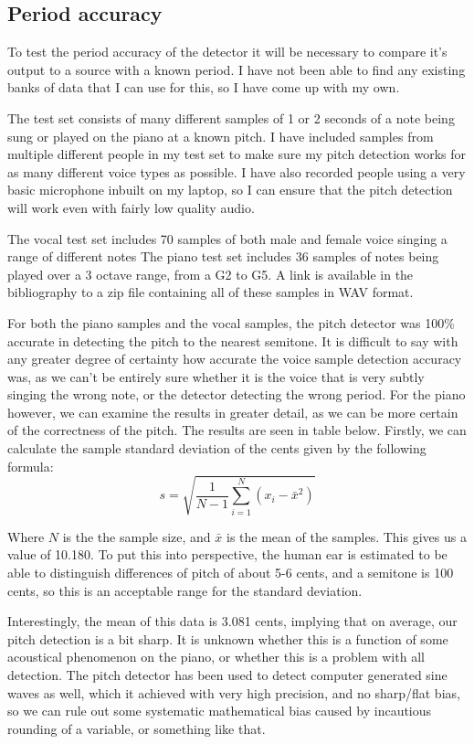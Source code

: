 \subsection{Period accuracy}
To test the period accuracy of the detector it will be necessary to compare it's output to a source with a known period. I have not been able to find any existing banks of data that I can use for this, so I have come up with my own\cite{testAudio}.

The test set consists of many different samples of 1 or 2 seconds of a note being sung or played on the piano at a known pitch. I have included samples from multiple different people in my test set to make sure my pitch detection works for as many different voice types as possible. I have also recorded people using a very basic microphone inbuilt on my laptop, so I can ensure that the pitch detection will work even with fairly low quality audio. 

The vocal test set includes 70 samples of both male and female voice singing a range of different notes The piano test set includes 36 samples of notes being played over a 3 octave range, from a G2 to G5. A link is available in the bibliography to a zip file containing all of these samples in WAV format\cite{testAudio}.

For both the piano samples and the vocal samples, the pitch detector was 100\% accurate in detecting the pitch to the nearest semitone. It is difficult to say with any greater degree of certainty how accurate the voice sample detection accuracy was, as we can't be entirely sure whether it is the voice that is very subtly singing the wrong note, or the detector detecting the wrong period. For the piano however, we can examine the results in  greater detail, as we can be more certain of the correctness of the pitch. The results are seen in table below.
Firstly, we can calculate the sample standard deviation of the cents given by the following formula:
\[s=\sqrt{\frac{1}{N-1}\sum_{i=1}^{N} (x_i - \bar{x}^2)}\]

Where \(N\) is the the sample size, and \(\bar{x}\) is the mean of the samples. This gives us a value of 10.180. To put this into perspective, the human ear is estimated to be able to distinguish differences of pitch of about 5-6 cents\cite{loeffler2006instrument}, and a semitone is 100 cents, so this is an acceptable range for the standard deviation.

Interestingly, the mean of this data is 3.081 cents, implying that on average, our pitch detection is a bit sharp. It is unknown whether this is a function of some acoustical phenomenon on the piano, or whether this is a problem with all detection. The pitch detector has been used to detect computer generated sine waves as well, which it achieved with very high precision, and no sharp/flat bias, so we can rule out some systematic mathematical bias caused by incautious rounding of a variable, or something like that.

